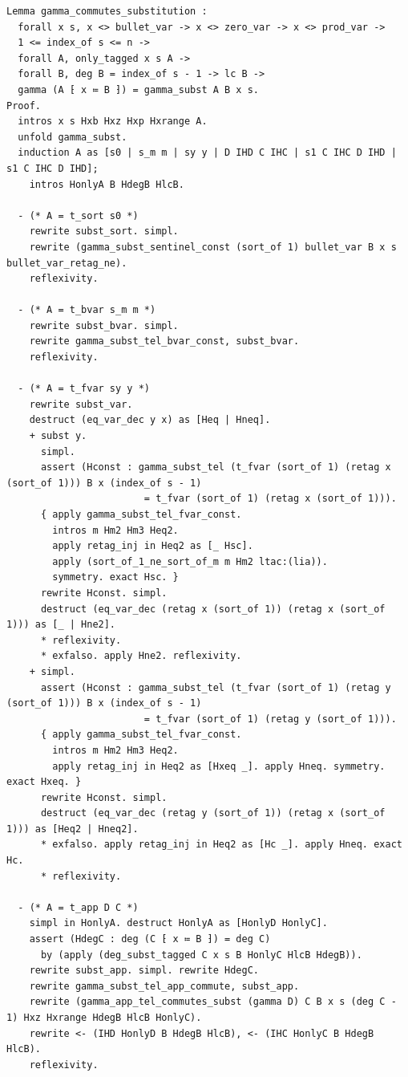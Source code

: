 \begin{latin}
\begin{verbatim}
Lemma gamma_commutes_substitution :
  forall x s, x <> bullet_var -> x <> zero_var -> x <> prod_var ->
  1 <= index_of s <= n ->
  forall A, only_tagged x s A ->
  forall B, deg B = index_of s - 1 -> lc B ->
  gamma (A ⁅ x ≔ B ⁆) = gamma_subst A B x s.
Proof.
  intros x s Hxb Hxz Hxp Hxrange A.
  unfold gamma_subst.
  induction A as [s0 | s_m m | sy y | D IHD C IHC | s1 C IHC D IHD | s1 C IHC D IHD];
    intros HonlyA B HdegB HlcB.

  - (* A = t_sort s0 *)
    rewrite subst_sort. simpl.
    rewrite (gamma_subst_sentinel_const (sort_of 1) bullet_var B x s bullet_var_retag_ne).
    reflexivity.

  - (* A = t_bvar s_m m *)
    rewrite subst_bvar. simpl.
    rewrite gamma_subst_tel_bvar_const, subst_bvar.
    reflexivity.

  - (* A = t_fvar sy y *)
    rewrite subst_var.
    destruct (eq_var_dec y x) as [Heq | Hneq].
    + subst y.
      simpl.
      assert (Hconst : gamma_subst_tel (t_fvar (sort_of 1) (retag x (sort_of 1))) B x (index_of s - 1)
                        = t_fvar (sort_of 1) (retag x (sort_of 1))).
      { apply gamma_subst_tel_fvar_const.
        intros m Hm2 Hm3 Heq2.
        apply retag_inj in Heq2 as [_ Hsc].
        apply (sort_of_1_ne_sort_of_m m Hm2 ltac:(lia)).
        symmetry. exact Hsc. }
      rewrite Hconst. simpl.
      destruct (eq_var_dec (retag x (sort_of 1)) (retag x (sort_of 1))) as [_ | Hne2].
      * reflexivity.
      * exfalso. apply Hne2. reflexivity.
    + simpl.
      assert (Hconst : gamma_subst_tel (t_fvar (sort_of 1) (retag y (sort_of 1))) B x (index_of s - 1)
                        = t_fvar (sort_of 1) (retag y (sort_of 1))).
      { apply gamma_subst_tel_fvar_const.
        intros m Hm2 Hm3 Heq2.
        apply retag_inj in Heq2 as [Hxeq _]. apply Hneq. symmetry. exact Hxeq. }
      rewrite Hconst. simpl.
      destruct (eq_var_dec (retag y (sort_of 1)) (retag x (sort_of 1))) as [Heq2 | Hneq2].
      * exfalso. apply retag_inj in Heq2 as [Hc _]. apply Hneq. exact Hc.
      * reflexivity.

  - (* A = t_app D C *)
    simpl in HonlyA. destruct HonlyA as [HonlyD HonlyC].
    assert (HdegC : deg (C ⁅ x ≔ B ⁆) = deg C)
      by (apply (deg_subst_tagged C x s B HonlyC HlcB HdegB)).
    rewrite subst_app. simpl. rewrite HdegC.
    rewrite gamma_subst_tel_app_commute, subst_app.
    rewrite (gamma_app_tel_commutes_subst (gamma D) C B x s (deg C - 1) Hxz Hxrange HdegB HlcB HonlyC).
    rewrite <- (IHD HonlyD B HdegB HlcB), <- (IHC HonlyC B HdegB HlcB).
    reflexivity.


\end{verbatim}
\end{latin}
